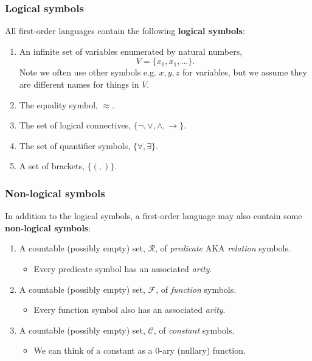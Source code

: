 \documentclass[handout]{beamer}
\newcommand{\cR}{\mathcal{R}}
\newcommand{\cF}{\mathcal{F}}
\newcommand{\cC}{\mathcal{C}}
\begin{document}
\begin{frame}
\frametitle{Logical symbols}
All first-order languages contain the following \textbf{logical symbols}:
\vspace{0.5cm}
\begin{enumerate}
\item An infinite set of variables enumerated by natural numbers, \[V=\{x_0,x_1,\ldots\}.\]
Note we often use other symbols e.g. $x,y,z$ for variables, but we assume they are different names for things in $V$.
\vspace{0.2cm}
\item The equality symbol, $\approx$. 
\vspace{0.2cm}
\item The set of logical connectives, $\{\neg,\vee,\wedge,\rightarrow\}$.
\vspace{0.2cm}
\item The set of quantifier symbols, $\{\forall,\exists\}$.
\vspace{0.2cm}
\item A set  of brackets, $\{(,)\}$.
\end{enumerate}
\end{frame}

\begin{frame}
\frametitle{Non-logical symbols}
In addition to the logical symbols, a first-order language may also contain some \textbf{non-logical symbols}:
\vspace{0.5cm}
\begin{enumerate}
\item A countable (possibly empty) set, $\cR$, of \emph{predicate} AKA \emph{relation} symbols. 
\begin{itemize}
\item Every predicate symbol has an associated \emph{arity}. 
\end{itemize}
\vspace{0.5cm}
\item A countable (possibly empty) set, $\cF$, of \emph{function} symbols.
\begin{itemize}
\item Every function symbol also has an associated \emph{arity}. 
\end{itemize}
\vspace{0.5cm}
\item A countable (possibly empty) set, $\cC$, of \emph{constant} symbols.
\begin{itemize}
\item We can think of a constant as a $0$-ary (nullary) function. 
\end{itemize}
\end{enumerate}
\end{frame}
\end{document}
